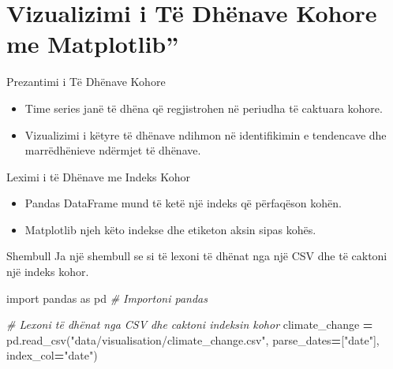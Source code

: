 \documentclass[
  ignorenonframetext,
]{beamer}
\newenvironment{Shaded}{\begin{snugshade}}{\end{snugshade}}
\newcommand{\CommentTok}[1]{\textcolor[rgb]{0.56,0.35,0.01}{\textit{#1}}}
\newcommand{\ImportTok}[1]{#1}
\newcommand{\NormalTok}[1]{#1}
\newcommand{\OperatorTok}[1]{\textcolor[rgb]{0.81,0.36,0.00}{\textbf{#1}}}
\newcommand{\StringTok}[1]{\textcolor[rgb]{0.31,0.60,0.02}{#1}}
\begin{document}
\hypertarget{vizualizimi-i-tuxeb-dhuxebnave-kohore-me-matplotlib}{%
\section{Vizualizimi i Të Dhënave Kohore me
Matplotlib''}\label{vizualizimi-i-tuxeb-dhuxebnave-kohore-me-matplotlib}}

\begin{frame}{Prezantimi i Të Dhënave Kohore}
\protect\hypertarget{prezantimi-i-tuxeb-dhuxebnave-kohore}{}
\begin{itemize}
\item
  Time series janë të dhëna që regjistrohen në periudha të caktuara
  kohore.
\item
  Vizualizimi i këtyre të dhënave ndihmon në identifikimin e tendencave
  dhe marrëdhënieve ndërmjet të dhënave.
\end{itemize}
\end{frame}

\begin{frame}{Leximi i të Dhënave me Indeks Kohor}
\protect\hypertarget{leximi-i-tuxeb-dhuxebnave-me-indeks-kohor}{}
\begin{itemize}
\item
  Pandas DataFrame mund të ketë një indeks që përfaqëson kohën.
\item
  Matplotlib njeh këto indekse dhe etiketon aksin sipas kohës.
\end{itemize}
\end{frame}

\begin{frame}[fragile]{Shembull}
\protect\hypertarget{shembull}{}
Ja një shembull se si të lexoni të dhënat nga një CSV dhe të caktoni një
indeks kohor.


\begin{Shaded}
\begin{Highlighting}[]
\ImportTok{import}\NormalTok{ pandas }\ImportTok{as}\NormalTok{ pd  }\CommentTok{\# Importoni pandas}

\CommentTok{\# Lexoni të dhënat nga CSV dhe caktoni indeksin kohor}
\NormalTok{climate\_change }\OperatorTok{=}\NormalTok{ pd.read\_csv(}\StringTok{"data/visualisation/climate\_change.csv"}\NormalTok{, parse\_dates}\OperatorTok{=}\NormalTok{[}\StringTok{"date"}\NormalTok{], index\_col}\OperatorTok{=}\StringTok{"date"}\NormalTok{)}
\end{Highlighting}
\end{Shaded}
\end{frame}
\end{document}
